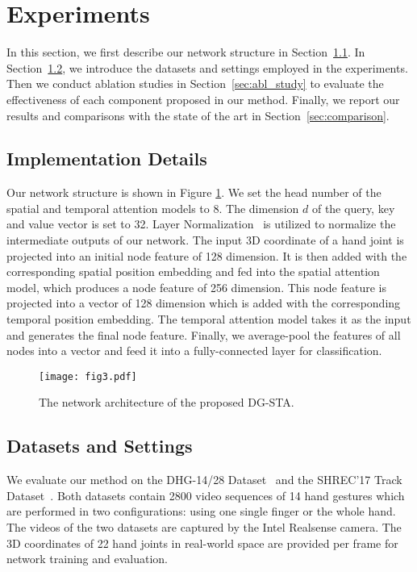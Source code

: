 \documentclass{bmvc2k}
\begin{document}
 \section{Experiments}
In this section, we first describe our network structure in Section~\ref{sec:arch}. In Section~\ref{sec:settings}, we introduce the datasets and settings employed in the experiments. Then we conduct ablation studies in Section~\ref{sec:abl_study} to evaluate the effectiveness of each component proposed in our method. Finally, we report our results and comparisons with the state of the art in Section~\ref{sec:comparison}.

\subsection{Implementation Details}
\label{sec:arch}

Our network structure is shown in Figure \ref{fig:arch}. We set the head number of the spatial and temporal attention models to 8. The dimension $d$ of the query, key and value vector is set to 32. Layer Normalization~\cite{ln} is utilized to normalize the intermediate outputs of our network. The input 3D coordinate of a hand joint is projected into an initial node feature of 128 dimension. It is then added with the corresponding spatial position embedding and fed into the spatial attention model, which produces a node feature of 256 dimension. This node feature is projected into a vector of 128 dimension which is added with the corresponding temporal position embedding. The temporal attention model takes it as the input and generates the final node feature. Finally, we average-pool the features of all nodes into a vector and feed it into a fully-connected layer for classification.

\begin{figure}[h]
\texttt{[image: fig3.pdf]}
\caption{The network architecture of the proposed DG-STA.}
\label{fig:arch}
\end{figure}

\subsection{Datasets and Settings}
\label{sec:settings}

We evaluate our method on the DHG-14/28 Dataset~\cite{de2016skeleton} and the SHREC'17 Track Dataset~\cite{de2017shrec}. Both datasets contain 2800 video sequences of 14 hand gestures which are performed in two configurations: using one single finger or the whole hand. The videos of the two datasets are captured by the Intel Realsense camera. The 3D coordinates of 22 hand joints in real-world space are provided per frame for network training and evaluation.
\end{document}
